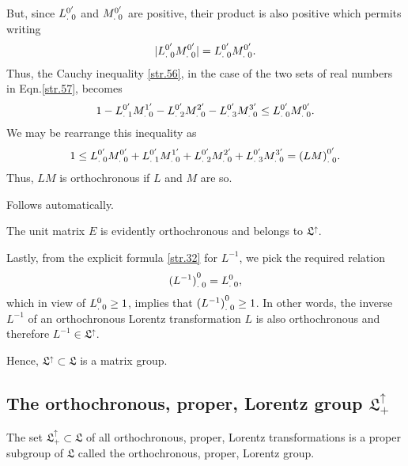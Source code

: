 \begin{small}
But, since ${{L}^{0'}_{.\;0}}$ and ${{M}^{0'}_{.\;0}}$ are 
positive, their product is also positive which permits 
writing
\begin{align*}
|{{L}^{0'}_{.\;0}}{{M}^{0'}_{.\;0}}| 
={{L}^{0'}_{.\;0}}{{M}^{0'}_{.\;0}}.
\end{align*}
Thus, the Cauchy inequality \eqref{str.56}, in the case of 
the two sets of real numbers in Eqn.\eqref{str.57}, becomes
\begin{align*}
1-{{L}^{0'}_{.\;1}}{{M}^{1'}_{.\;0}}-
{{L}^{0'}_{.\;2}}{{M}^{2'}_{.\;0}}-{{L}^{0'}_{.\;3}}{{M}^{3'}_{.\;0}}
\leq {\ensuremath{{L}^{0'}_{.\;0}}}{\ensuremath{{M}^{0'}_{.\;0}}}.
\end{align*}
We may be rearrange this inequality as 
\begin{align} \label{str.58}
1\leq{\ensuremath{{L}^{0'}_{.\;0}}}{\ensuremath{{M}^{0'}_{.\;0}}} +
{{L}^{0'}_{.\;1}}{{M}^{1'}_{.\;0}}+
{{L}^{0'}_{.\;2}}{{M}^{2'}_{.\;0}}+
{{L}^{0'}_{.\;3}}{{M}^{3'}_{.\;0}}
={{(LM)}^{0'}_{.\;0}}.
\end{align}
Thus, $LM$ is orthochronous if $L$ and $M$ are so.

Follows automatically.

The unit matrix $E$ is evidently
orthochronous and belongs to $\mathfrak{L}^\uparrow$.

Lastly, from the explicit formula 
\eqref{str.32} for $L^{-1}$, we pick the required relation
\begin{align}\label{4.59}
{\ensuremath{{(L^{-1})}^{0}_{.\;0}}}={{{L}^{0}_{.\;0}}},
\end{align}
which in view of ${{L}^{0}_{.\;0}}\geq1$, implies that 
${{(L^{-1})}^{0}_{.\;0}}\geq1$. In other words, the inverse 
$L^{-1}$ of an orthochronous Lorentz transformation $L$ is 
also orthochronous and therefore  $L^{-1}\in 
\mathfrak{L}^\uparrow$.

Hence, $\mathfrak{L}^\uparrow\subset \mathfrak{L}$ is a 
matrix group.

\subsection{The orthochronous, proper,  Lorentz 
group {$\mathfrak{L}_+^\uparrow$}{}}

\lem The set $\mathfrak{L}_+^\uparrow \subset \mathfrak{L}$ 
of all orthochronous, proper, Lorentz transformations is a 
proper subgroup of $\mathfrak{L}$ called the orthochronous, 
proper, Lorentz group.


\end{small}
